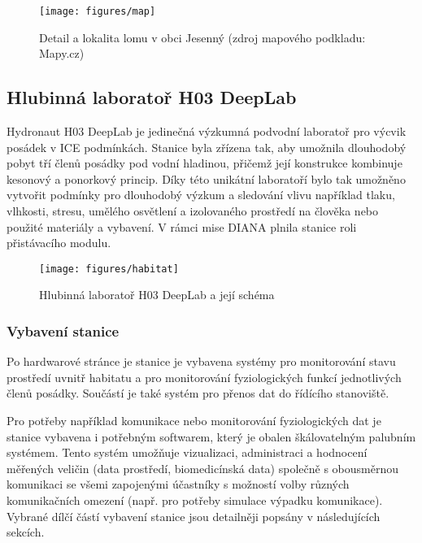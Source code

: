 \begin{figure}[h]
    \begin{center}
        \texttt{[image: figures/map]}
        \caption{Detail a lokalita lomu v obci Jesenný (zdroj mapového podkladu: Mapy.cz)}
        \label{fig:map}
    \end{center}
\end{figure}

\subsection{Hlubinná laboratoř H03 DeepLab}
\label{subsubsec:h03_deeplab}
Hydronaut H03 DeepLab je jedinečná výzkumná podvodní laboratoř pro výcvik
posádek v \gls{ICE} podmínkách. Stanice byla zřízena tak, aby umožnila
dlouhodobý pobyt tří členů posádky pod vodní hladinou, přičemž její konstrukce
kombinuje kesonový a ponorkový princip. Díky této unikátní laboratoří bylo tak
umožněno vytvořit podmínky pro dlouhodobý výzkum a sledování vlivu například
tlaku, vlhkosti, stresu, umělého osvětlení a izolovaného prostředí na člověka
nebo použité materiály a vybavení. V rámci mise DIANA plnila stanice roli
přistávacího modulu.

\begin{figure}[h]
    \begin{center}
        \texttt{[image: figures/habitat]}
        \caption{Hlubinná laboratoř H03 DeepLab a její schéma}
        \label{fig:habitat}
    \end{center}
\end{figure}

\subsubsection{Vybavení stanice}
\label{subsubsec:vybaveni_stanice}
Po hardwarové stránce je stanice je vybavena systémy pro monitorování stavu
prostředí uvnitř habitatu a pro monitorování fyziologických funkcí jednotlivých
členů posádky. Součástí je také systém pro přenos dat do řídícího stanoviště.

Pro potřeby například komunikace nebo monitorování fyziologických dat je stanice
vybavena i potřebným softwarem, který je obalen škálovatelným palubním systémem.
Tento systém umožňuje vizualizaci, administraci a hodnocení měřených veličin
(data prostředí, biomedicínská data) společně s obousměrnou komunikaci se všemi
zapojenými účastníky s možností volby různých komunikačních omezení (např. pro
potřeby simulace výpadku komunikace). Vybrané dílčí částí vybavení stanice jsou
detailněji popsány v následujících sekcích.


